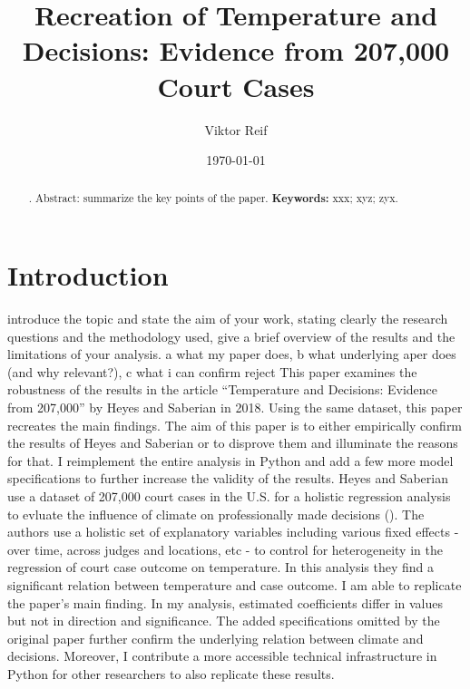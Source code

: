 \documentclass[11pt]{article}
\title{Recreation of Temperature and Decisions: Evidence from 207,000
	Court Cases}
\author{Viktor Reif}
\date{\today}
\begin{document}
	\maketitle
	
	
	\begin{abstract}
		\singlespacing
		. Abstract: summarize the key points of the paper.
		\lipsum[1]
		\newline \noindent \textbf{Keywords:} xxx; xyz; zyx. 
	\end{abstract} \newpage
	
	
	\section{Introduction}
	introduce the topic and state the aim of your work, stating clearly the
	research questions and the methodology used, give a brief overview of the results and the
	limitations of your analysis.
	a what my paper does, b what underlying aper does (and why relevant?), c what i can confirm reject
	\newline This paper examines the robustness of the results in the article “Temperature and Decisions: Evidence from 207,000” by Heyes and Saberian in 2018. Using the same dataset, this paper recreates the main findings. The aim of this paper is to either empirically confirm the results of Heyes and Saberian or to disprove them and illuminate the reasons for that. I reimplement the entire analysis in Python and add a few more model specifications to further increase the validity of the results.
	\newline Heyes and Saberian use a dataset of 207,000 court cases in the U.S. for a holistic regression analysis to evluate the influence of climate on professionally made decisions (\cite{Heyes.2019}). The authors use a holistic set of explanatory variables including various fixed effects - over time, across judges and locations, etc - to control for heterogeneity in the regression of court case outcome on temperature. In this analysis they find a significant relation between temperature and case outcome.
	\newline I am able to replicate the paper’s main finding. In my analysis, estimated coefficients differ in values but not in direction and significance. The added specifications omitted by the original paper further confirm the underlying relation between climate and decisions. Moreover, I contribute a more accessible technical infrastructure in Python for other researchers to also replicate these results.  
\end{document}
